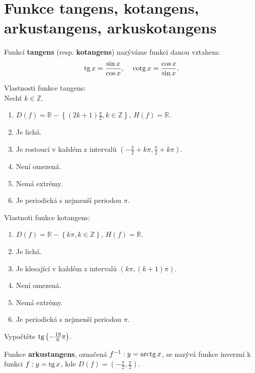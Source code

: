 \section{Funkce tangens, kotangens, arkustangens, arkuskotangens}
\begin{definition}
  Funkcí \textbf{tangens} (resp. \textbf{kotangens}) nazýváme funkci danou vztahem:
  \begin{align*}
    \tg x = \frac{\sin x}{\cos x}, & & \cotg x = \frac{\cos x}{\sin x}.
  \end{align*}
\end{definition}

\begin{veta}
    Vlastnosti funkce tangens:\\
    Nechť $k\in \mathbb Z.$
    \begin{enumerate}[$i.$]
        \item $D(f)= \mathbb R-\left \{ (2k+1)\frac{\pi}{2}, k\in \mathbb Z \right \} $, $H(f)= \mathbb R $.
       	\item Je lichá.
        \item Je rostoucí v každém z intervalů $\left ( -\frac{\pi}{2}+k\pi, \frac{\pi}{2}+k\pi \right ) $.
        \item Není omezená.
        \item Nemá extrémy.
        \item Je periodická s nejmenší periodou $\pi.$
    \end{enumerate}
    Vlastnoti funkce kotangens:
    \begin{enumerate}[$i.$]
        \item $D(f)= \mathbb R-\left \{ k\pi, k\in \mathbb Z \right \} $, $H(f)= \mathbb R $.
       	\item Je lichá.
        \item Je klesající v každém z intervalů $\left ( k\pi, (k+1)\pi \right ) $.
        \item Není omezená.
        \item Nemá extrémy.
        \item Je periodická s nejmenší periodou $\pi.$
    \end{enumerate}
\end{veta}

\begin{priklad}
Vypočtěte $\operatorname{tg} \left ( -\frac{19}{6}\pi \right ) $.
\end{priklad}

\begin{definition}
  Funkce \textbf{arkustangens}, označená $f^{-1}: y=\operatorname{arctg} x$, se nazývá funkce inverzní k funkci $f: y=\operatorname{tg} x$, kde $D(f)=\left ( -\frac{\pi}{2}, \frac{\pi}{2} \right )$.
\end{definition}

